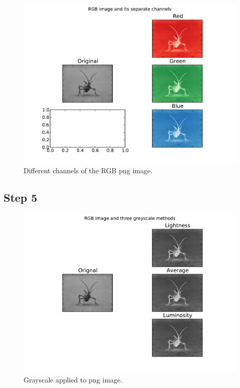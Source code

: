 \documentclass[a4paper]{article}
\begin{document}
\begin{figure}[h!] 
\begin{center} 
\includegraphics[scale=0.5]{../Week4/BLAC_hw6_TLRH_6126561_separate_channels.pdf} 
\caption{Different channels of the RGB png image.}
\end{center} 
\end{figure} 

\subsection*{Step 5}
\begin{figure}[h!] 
\begin{center} 
\includegraphics[scale=0.5]{../Week4/BLAC_hw6_TLRH_6126561_greyscale.pdf} 
\caption{Grayscale applied to png image.}
\end{center} 
\end{figure} 
\end{document}
